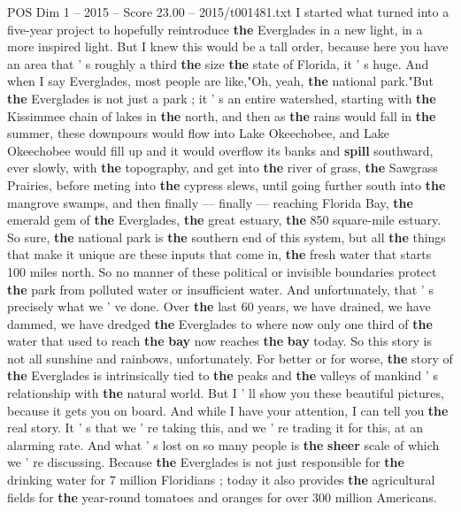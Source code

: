 \begin{textsample}{POS Dim 1 – 2015 – Score 23.00 – 2015/t001481.txt}
I started what turned into a five-year project to hopefully reintroduce \textbf{the} Everglades in a new light, in a more inspired light.
But I knew this would be a tall order, because here you have an area that ' s roughly a third \textbf{the} size \textbf{the} state of Florida, it ' s huge.
And when I say Everglades, most people are like,"Oh, yeah, \textbf{the} national park."But \textbf{the} Everglades is not just a park ; it ' s an entire watershed, starting with \textbf{the} Kissimmee chain of lakes in \textbf{the} north, and then as \textbf{the} rains would fall in \textbf{the} summer, these downpours would flow into Lake Okeechobee, and Lake Okeechobee would fill up and it would overflow its banks and \textbf{spill} southward, ever slowly, with \textbf{the} topography, and get into \textbf{the} river of grass, \textbf{the} Sawgrass Prairies, before meting into \textbf{the} cypress slews, until going further south into \textbf{the} mangrove swamps, and then finally — finally — reaching Florida Bay, \textbf{the} emerald gem of \textbf{the} Everglades, \textbf{the} great estuary, \textbf{the} 850 square-mile estuary.
So sure, \textbf{the} national park is \textbf{the} southern end of this system, but all \textbf{the} things that make it unique are these inputs that come in, \textbf{the} fresh water that starts 100 miles north.
So no manner of these political or invisible boundaries protect \textbf{the} park from polluted water or insufficient water.
And unfortunately, that ' s precisely what we ' ve done.
Over \textbf{the} last 60 years, we have drained, we have dammed, we have dredged \textbf{the} Everglades to where now only one third of \textbf{the} water that used to reach \textbf{the} \textbf{bay} now reaches \textbf{the} \textbf{bay} today.
So this story is not all sunshine and rainbows, unfortunately.
For better or for worse, \textbf{the} story of \textbf{the} Everglades is intrinsically tied to \textbf{the} peaks and \textbf{the} valleys of mankind ' s relationship with \textbf{the} natural world.
But I ' ll show you these beautiful pictures, because it gets you on board.
And while I have your attention, I can tell you \textbf{the} real story.
It ' s that we ' re taking this, and we ' re trading it for this, at an alarming rate.
And what ' s lost on so many people is \textbf{the} \textbf{sheer} scale of which we ' re discussing.
Because \textbf{the} Everglades is not just responsible for \textbf{the} drinking water for 7 million Floridians ; today it also provides \textbf{the} agricultural fields for \textbf{the} year-round tomatoes and oranges for over 300 million Americans.

\end{textsample}
